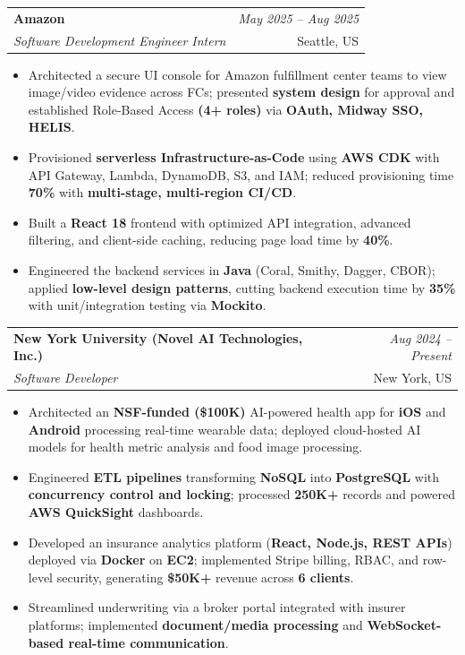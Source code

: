 \documentclass[a4paper,10pt]{article}
\makeatletter
\newcommand{\resumeSubheading}[4]{
\vspace{0.3mm}\item
    \begin{tabular*}{0.98\textwidth}[t]{l@{\extracolsep{\fill}}r}
        \textbf{#1} & \textit{\footnotesize{#4}} \\
        \textit{\footnotesize{#3}} & \footnotesize{#2}\\
    \end{tabular*}\vspace{-2mm}
}
\newcommand{\resumeItemListStart}{\begin{itemize}[leftmargin=*, labelsep=1mm, itemsep=0pt]}
\newcommand{\resumeItemListEnd}{\end{itemize}\vspace{-2mm}}
\makeatother
\begin{document}
\resumeSubheading
{Amazon}{Seattle, US}
{Software Development Engineer Intern}{May 2025 -- Aug 2025}
\resumeItemListStart
\item \footnotesize{Architected a secure UI console for Amazon fulfillment center teams to view image/video evidence across FCs; presented \textbf{system design} for approval and established Role-Based Access \textbf{(4+ roles)} via \textbf{OAuth, Midway SSO, HELIS}.}
\item \footnotesize{Provisioned \textbf{serverless Infrastructure-as-Code} using \textbf{AWS CDK} with API Gateway, Lambda, DynamoDB, S3, and IAM; reduced provisioning time \textbf{70\%} with \textbf{multi-stage, multi-region CI/CD}.}
\item \footnotesize{Built a \textbf{React 18} frontend with optimized API integration, advanced filtering, and client-side caching, reducing page load time by \textbf{40\%}.}
\item \footnotesize{Engineered the backend services in \textbf{Java} (Coral, Smithy, Dagger, CBOR); applied \textbf{low-level design patterns}, cutting backend execution time by \textbf{35\%} with unit/integration testing via \textbf{Mockito}.}
\resumeItemListEnd

\resumeSubheading
{New York University (Novel AI Technologies, Inc.)}{New York, US}
{Software Developer}{Aug 2024 -- Present}
\resumeItemListStart
\item \footnotesize{Architected an \textbf{NSF-funded (\$100K)} AI-powered health app for \textbf{iOS} and \textbf{Android} processing real-time wearable data; deployed cloud-hosted AI models for health metric analysis and food image processing.}
\item \footnotesize{Engineered \textbf{ETL pipelines} transforming \textbf{NoSQL} into \textbf{PostgreSQL} with \textbf{concurrency control and locking}; processed \textbf{250K+} records and powered \textbf{AWS QuickSight} dashboards.}
\item \footnotesize{Developed an insurance analytics platform (\textbf{React, Node.js, REST APIs}) deployed via \textbf{Docker} on \textbf{EC2}; implemented Stripe billing, RBAC, and row-level security, generating \textbf{\$50K+} revenue across \textbf{6 clients}.}
\item \footnotesize{Streamlined underwriting via a broker portal integrated with insurer platforms; implemented \textbf{document/media processing} and \textbf{WebSocket-based real-time communication}.}
\resumeItemListEnd
\end{document}
